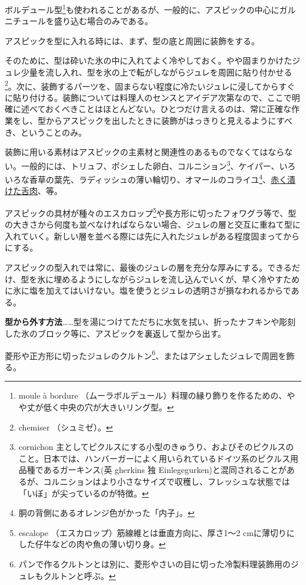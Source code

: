 ボルデュール型\footnote{moule à bordure
  （ムーラボルデュール）料理の縁り飾りを作るための、やや丈が低く中央の穴が大きいリング型。}も使われることがあるが、一般的に、アスピックの中心にガルニチュールを盛り込む場合のみである。

アスピックを型に入れる時には、まず、型の底と周囲に装飾をする。

そのために、型は砕いた氷の中に入れてよく冷やしておく。やや固まりかけたジュレ少量を流し入れ、型を氷の上で転がしながらジュレを周囲に貼り付かせる\footnote{chemiser
  （シュミゼ）。}。次に、装飾するパーツを、固まらない程度に冷たいジュレに浸してからすぐに貼り付ける。装飾については料理人のセンスとアイデア次第なので、ここで明確に述べておくべきことはほとんどない。ひとつだけ言えるのは、常に正確な作業をし、型からアスピックを出したときに装飾がはっきりと見えるようにすべき、ということのみ。

装飾に用いる素材はアスピックの主素材と関連性のあるものでなくてはならない。一般的には、トリュフ、ポシェした卵白、コルニション\footnote{cornichon
  主としてピクルスにする小型のきゅうり、およびそのピクルスのこと。日本では、ハンバーガーによく用いられているドイツ系のピクルス用品種であるガーキンス(英
  gherkins 独
  Einlegegurken)と混同されることがあるが、コルニションはより小さなサイズで収穫し、フレッシュな状態では「いぼ」が尖っているのが特徴。}、ケイパー、いろいろな香草の葉先、ラディッシュの薄い輪切り、オマールのコライユ\footnote{胴の背側にあるオレンジ色がかった「内子」。}、\protect\hyperlink{saumure-liquide-pour-langues}{赤く漬けた舌肉}、等。

アスピックの具材が種々のエスカロップ\footnote{escalope
  （エスカロップ）筋線維とは垂直方向に、厚さ1〜2
  cmに薄切りにした仔牛などの肉や魚の薄い切り身。}や長方形に切ったフォワグラ等で、型の大きさから何度も並べなければならない場合、ジュレの層と交互に重ねて型に入れていく。新しい層を並べる際には先に入れたジュレがある程度固まってからにする。

アスピックの型入れでは常に、最後のジュレの層を充分な厚みにする。できるだけ、型を氷に埋めるようにしながらジュレを流し込んでいくが、早く冷やすために氷に塩を加えてはいけない。塩を使うとジュレの透明さが損なわれるからである。

\noindent\textbf{型から外す方法}\ldots{}\ldots{}型を湯につけてただちに水気を拭い、折ったナフキンや彫刻した氷のブロック等に、アスピックを裏返して型から出す。

菱形や正方形に切ったジュレのクルトン\footnote{パンで作るクルトンとは別に、菱形やさいの目に切った冷製料理装飾用のジュレもクルトンと呼ぶ。}、またはアシェしたジュレで周囲を飾る。

